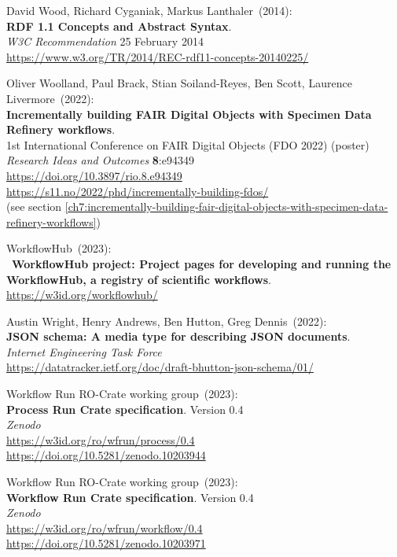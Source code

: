 \begin{thebibliography}{9}
David Wood, Richard Cyganiak, Markus Lanthaler~(2014): \\
\textbf{RDF 1.1 Concepts and Abstract Syntax}.\\
\emph{W3C Recommendation} 25 February 2014\\
\url{https://www.w3.org/TR/2014/REC-rdf11-concepts-20140225/}

Oliver Woolland, Paul Brack, Stian Soiland-Reyes, Ben Scott, Laurence
Livermore~(2022): \\
\textbf{Incrementally building FAIR Digital Objects with Specimen Data
Refinery workflows}.\\
1st International Conference on FAIR Digital Objects
(FDO 2022) (poster)\\
\emph{Research Ideas and Outcomes} \textbf{8}:e94349\\
\url{https://doi.org/10.3897/rio.8.e94349}\\
\url{https://s11.no/2022/phd/incrementally-building-fdos/}\\
(see section \vref{ch7:incrementally-building-fair-digital-objects-with-specimen-data-refinery-workflows})

WorkflowHub~(2023): \\
~\textbf{WorkflowHub project: Project pages for developing and
running the WorkflowHub, a registry of scientific workflows}.\\
\url{https://w3id.org/workflowhub/}

Austin Wright, Henry Andrews, Ben Hutton, Greg Dennis~(2022): \\
\textbf{JSON schema: A media type for describing JSON documents}.\\
\emph{Internet Engineering Task Force}\\
\url{https://datatracker.ietf.org/doc/draft-bhutton-json-schema/01/}

Workflow Run RO-Crate working group~(2023): \\
\textbf{Process Run Crate specification}. Version 0.4\\
\emph{Zenodo}\\
\url{https://w3id.org/ro/wfrun/process/0.4}\\
\url{https://doi.org/10.5281/zenodo.10203944}

Workflow Run RO-Crate working group~(2023): \\
\textbf{Workflow Run Crate specification}. Version 0.4\\
\emph{Zenodo}\\
\url{https://w3id.org/ro/wfrun/workflow/0.4}\\
\url{https://doi.org/10.5281/zenodo.10203971}


\end{thebibliography}
